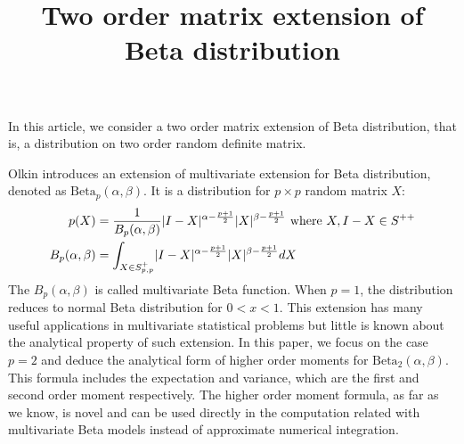 \documentclass{article}
\title{Two order matrix extension of Beta distribution}
\DeclarePairedDelimiter\abs{\lvert}{\rvert}
\def\Beta{\textrm{Beta}}
\begin{document}
In this article, we consider a two order matrix extension of Beta distribution,
that is, a distribution on two order random definite matrix.

Olkin introduces an extension of multivariate extension for Beta distribution,
denoted as $\Beta_p(\alpha, \beta)$.
It is a distribution for $p\times p$ random matrix $X$:
\begin{align}
p(X) &= \frac{1}{B_p(\alpha, \beta)}\abs{I-X}^{\alpha-\frac{p+1}{2}}
\abs{X}^{\beta-\frac{p+1}{2}} \textrm{ where } X, I-X \in S^{++} \\
B_p(\alpha, \beta) &= \int_{X \in S_{p,p}^{+} }\abs{I-X}^{\alpha-\frac{p+1}{2}}
\abs{X}^{\beta-\frac{p+1}{2}}dX
\end{align}
The $B_p(\alpha, \beta)$ is called multivariate Beta function.
When $p=1$, the distribution reduces to normal Beta distribution for
$0<x<1$. This extension has many useful applications in multivariate statistical
problems but little is known about the analytical property of such extension.
In this paper, we focus on the case $p=2$ and deduce the analytical form of 
higher order moments for $\Beta_2(\alpha, \beta)$. This formula
includes the expectation and variance, which are the first and second
order moment respectively. The higher order moment formula, as
far as we know, is novel and can be used directly in the computation
related with multivariate Beta models instead of approximate
numerical integration.
\end{document}
